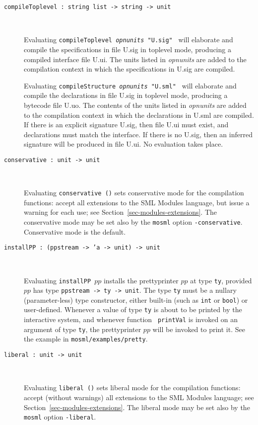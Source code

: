 \documentclass[fleqn,a4paper]{article}
\begin{document}
\begin{description}
\item[{\tt compileToplevel :\ string list -> string -> unit}]\mbox{ }
  
  Evaluating \texttt{compileToplevel \textit{opnunits} "{\rm U.sig}" }
  will elaborate and compile the specifications in file U.sig in
  toplevel mode, producing a compiled interface file U.ui.  The units
  listed in \textit{opnunits} are added to the compilation context in
  which the specifications in U.sig are compiled.
  
  Evaluating \texttt{compileStructure \textit{opnunits} "{\rm U.sml}"
    } will elaborate and compile the declarations in file U.sig in
  toplevel mode, producing a bytecode file U.uo.  The contents of the
  units listed in \textit{opnunits} are added to the compilation
  context in which the declarations in U.sml are compiled.  If there
  is an explicit signature U.sig, then file U.ui must exist, and
  declarations must match the interface.  If there is no U.sig, then
  an inferred signature will be produced in file U.ui.  No evaluation
  takes place.

\item[{\tt conservative :\ unit -> unit}]\mbox{ }
  
  Evaluating \texttt{conservative ()} sets conservative mode for the
  compilation functions: accept all extensions to the SML Modules
  language, but issue a warning for each use; see
  Section~\ref{sec-modules-extensions}.  The conservative mode may be
  set also by the \texttt{mosml} option \texttt{-conservative}.
  Conservative mode is the default.

\item[{\tt installPP :\ (ppstream -> 'a -> unit) -> unit}]\mbox{ }

  Evaluating {\tt installPP $pp$} installs the prettyprinter $pp$ at
  type {\tt ty}, provided $pp$ has type {\tt ppstream -> ty -> unit}.
  The type {\tt ty} must be a nullary (parameter-less) type
  constructor, either built-in (such as {\tt int} or {\tt bool}) or
  user-defined.  Whenever a value of type {\tt ty} is about to be
  printed by the interactive system, and whenever function {\tt
    printVal} is invoked on an argument of type {\tt ty}, the
  prettyprinter $pp$ will be invoked to print it.  See the example in
  {\tt mosml/examples/pretty}.

\item[{\tt liberal :\ unit -> unit}]\mbox{ }
  
  Evaluating \texttt{liberal ()} sets liberal mode for the compilation
  functions: accept (without warnings) all extensions to the SML
  Modules language; see Section~\ref{sec-modules-extensions}.  The
  liberal mode may be set also by the \texttt{mosml} option
  \texttt{-liberal}.


\end{description}
\end{document}
